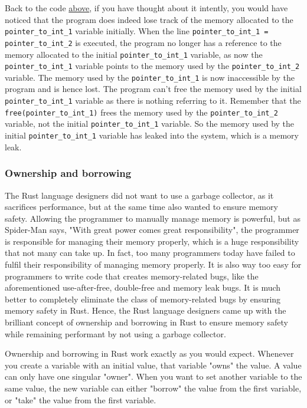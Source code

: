 \documentclass[11pt]{article}
\begin{document}
 \newpage

Back to the code \hyperref[org3c03684]{above}, if you have thought
about it intently, you would have noticed that the
program does indeed lose track of the memory
allocated to the \texttt{pointer\_to\_int\_1} variable initially.
When the line \texttt{pointer\_to\_int\_1 = pointer\_to\_int\_2}
is executed, the program no longer has a reference
to the memory allocated to the initial \texttt{pointer\_to\_int\_1}
variable, as now the \texttt{pointer\_to\_int\_1} variable
points to the memory used by the \texttt{pointer\_to\_int\_2}
variable. The memory used by the \texttt{pointer\_to\_int\_1}
is now inaccessible by the program and is hence lost.
The program can't free the memory used by the
initial \texttt{pointer\_to\_int\_1} variable as there is nothing
referring to it. Remember that the \texttt{free(pointer\_to\_int\_1)}
frees the memory used by the \texttt{pointer\_to\_int\_2} variable,
not the initial \texttt{pointer\_to\_int\_1} variable.
So the memory used by the initial \texttt{pointer\_to\_int\_1}
variable has leaked into the system, which is a memory leak.

\subsubsection{Ownership and borrowing}
\label{sec:orgd46a3bc}
The Rust language designers did not want to use a garbage collector,
as it sacrifices performance, but at the same time also wanted
to ensure memory safety. Allowing the programmer to manually manage
memory is powerful, but as Spider-Man says,
"With great power comes great responsibility",
the programmer is responsible for managing their memory properly,
which is a huge responsibility that not many can take up.
In fact, too many programmers today have failed to fulfil
their responsibility of managing memory properly.
It is also way too easy for programmers to write code that
creates memory-related bugs, like the aforementioned use-after-free,
double-free and memory leak bugs. It is much better to completely
eliminate the class of memory-related bugs by ensuring memory safety
in Rust. Hence, the Rust language designers came up with the brilliant
concept of ownership and borrowing in Rust to ensure memory safety
while remaining performant by not using a garbage collector.  \\

 \newpage

Ownership and borrowing in Rust work exactly as you would expect.
Whenever you create a variable with an initial value, that variable
"owns" the value. A value can only have one singular "owner".
When you want to set another variable to the same
value, the new variable can either "borrow" the value from the first
variable, or "take" the value from the first variable.
\end{document}
